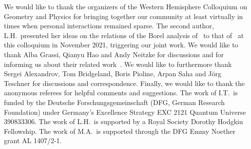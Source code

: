 \documentclass[pdftex]{sigma}
\numberwithin{equation}{section}
\begin{document}
We would like to thank the organizers of the Western Hemisphere Colloquium on Geometry and Physics for bringing together our community at least virtually in times when personal interactions remained sparse. The second author, L.H.~presented her ideas on the relations of the Borel analysis of~\cite{Hollands:recipe} to that of~\cite{ASTT21} at this colloquium in November 2021, triggering our joint work. We would like to thank Alba Grassi, Qianyu Hao and Andy Neitzke for discussions and for informing us about their related work~\cite{GHN}. We would like to furthermore thank Sergei Alexandrov, Tom Bridgeland, Boris Pioline, Arpan Saha and J\"org Teschner for discussions and correspondence. Finally, we would like to thank the anonymous referees for helpful comments and suggestions. The work of I.T.~is funded by the Deutsche Forschungsgemeinschaft (DFG, German Research Foundation) under Germany's Excellence Strategy EXC 2121 Quantum Universe 390833306. The work of L.H.~is supported by a Royal Society Dorothy Hodgkin Fellowship. The work of M.A.~is supported through the DFG Emmy Noether grant AL 1407/2-1.
\end{document}
